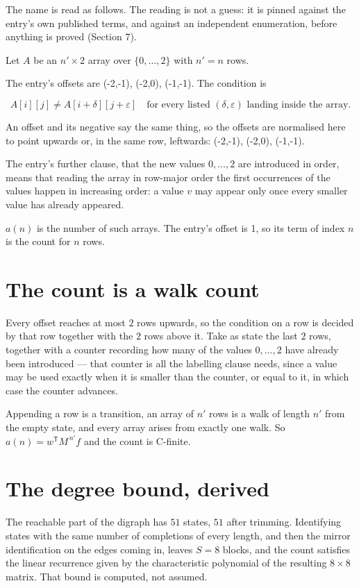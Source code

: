 \documentclass[11pt]{article}
\theoremstyle{definition}
\begin{document}
The name is read as follows. The reading is not a guess: it is pinned against the entry's own published terms, and against an independent enumeration, before anything is proved (Section 7).

Let $A$ be an $n' \times 2$ array over $\{0,\dots,2\}$ with $n' = n$ rows.

The entry's offsets are (-2,-1), (-2,0), (-1,-1). The condition is

\[A[i][j] \ne A[i{+}\delta][j{+}\varepsilon]\quad\text{for every listed }(\delta,\varepsilon)\text{ landing inside the array.}\]

An offset and its negative say the same thing, so the offsets are normalised here to point upwards or, in the same row, leftwards: (-2,-1), (-2,0), (-1,-1).

The entry's further clause, that the new values $0,\dots,2$ are introduced in order, means that reading the array in row-major order the first occurrences of the values happen in increasing order: a value $v$ may appear only once every smaller value has already appeared.

$a(n)$ is the number of such arrays. The entry's offset is 1, so its term of index $n$ is the count for $n$ rows.

\section{The count is a walk count}

Every offset reaches at most $2$ rows upwards, so the condition on a row is decided by that row together with the $2$ rows above it. Take as state the last $2$ rows, together with a counter recording how many of the values $0,\dots,2$ have already been introduced --- that counter is all the labelling clause needs, since a value may be used exactly when it is smaller than the counter, or equal to it, in which case the counter advances.

Appending a row is a transition, an array of $n'$ rows is a walk of length $n'$ from the empty state, and every array arises from exactly one walk. So $a(n) = w^{\mathsf T}M^{\,n'}f$ and the count is C-finite.

\section{The degree bound, derived}

The reachable part of the digraph has $51$ states, $51$ after trimming. Identifying states with the same number of completions of every length, and then the mirror identification on the edges coming in, leaves $S = 8$ blocks, and the count satisfies the linear recurrence given by the characteristic polynomial of the resulting $8\times8$ matrix. That bound is computed, not assumed.
\end{document}
